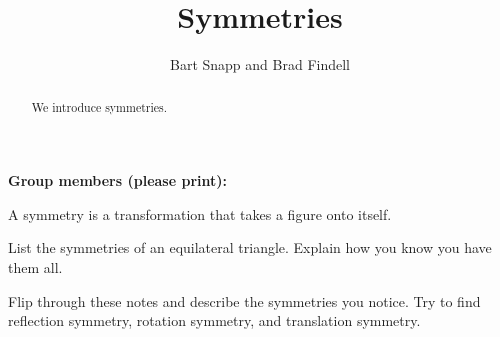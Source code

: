 \documentclass[handout,noauthor,nooutcomes]{ximera}
\title{Symmetries}
\author{Bart Snapp and Brad Findell}
\begin{document}
\begin{abstract}
  We introduce symmetries.
\end{abstract}
\maketitle

\noindent\textbf{Group members (please print):}\ \hrulefill \\

\hrulefill

\begin{definition}
A symmetry is a transformation that takes a figure onto itself.  
\end{definition}
\begin{problem}
List the symmetries of an equilateral triangle.  Explain how you know you have them all.  
\end{problem}

\begin{problem}
Flip through these notes and describe the symmetries you notice.  Try to find reflection symmetry, rotation symmetry, and translation symmetry.  
\end{problem}

\end{document}
